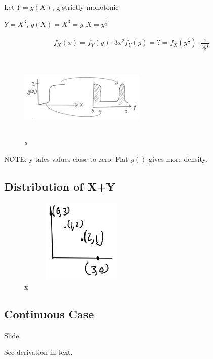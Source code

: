 \documentclass{article}
\begin{document}
Let $Y=g(X)$, g strictly monotonic


$Y=X^3$, $g(X)=X^3 = y$
$X=y^\frac{1}{3}$

\begin{align*}
f_X(x)=f_{Y}(y)\cdot 3x^2
f_Y(y)=?
 = f_X(y^\frac{1}{3}) \cdot \frac{1}{3y^\frac{2}{3}}
\end{align*}


\begin{figure}[h]
\centering
\includegraphics[width=6cm, height=4cm]{images/L11/strictly_monotonic.jpeg}
\caption{x}
\end{figure}

NOTE: y tales values close to zero. Flat $g()$ gives more density.

\subsection{Distribution of X+Y}


\begin{figure}[h]
\centering
\includegraphics[width=6cm, height=4cm]{images/L11/dist_x_y.jpeg}
\caption{x}
\end{figure}

\subsection{Continuous Case}


Slide.

See derivation in text.
\end{document}
